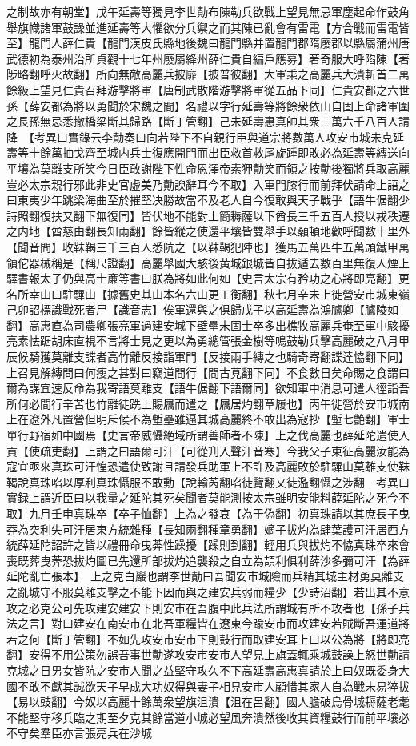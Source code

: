 之制故亦有朝堂】戊午延壽等獨見李世勣布陳勒兵欲戰上望見無忌軍塵起命作鼓角舉旗幟諸軍鼓譟並進延壽等大懼欲分兵禦之而其陳已亂會有雷電【方合戰而雷電皆至】龍門人薛仁貴【龍門漢皮氏縣地後魏曰龍門縣并置龍門郡隋廢郡以縣屬蒲州唐武德初為泰州治所貞觀十七年州廢屬絳州薛仁貴自編戶應募】著奇服大呼陷陳【著陟略翻呼火故翻】所向無敵高麗兵披靡【披普彼翻】大軍乘之高麗兵大潰斬首二萬餘級上望見仁貴召拜游擊將軍【唐制武散階游擊將軍從五品下同】仁貴安都之六世孫【薛安都為將以勇聞於宋魏之間】名禮以字行延壽等將餘衆依山自固上命諸軍圍之長孫無忌悉撤橋梁斷其歸路【斷丁管翻】己未延壽惠真帥其衆三萬六千八百人請降　【考異曰實錄云李勣奏曰向若陛下不自親行臣與道宗將數萬人攻安市城未克延壽等十餘萬抽戈齊至城内兵士復應開門而出臣救首救尾旋踵即敗必為延壽等縳送向平壤為莫離支所笑今日臣敢謝陛下性命恩澤帝素狎勣笑而領之按勣後獨將兵取高麗豈必太宗親行邪此非史官虚美乃勣諛辭耳今不取】入軍門膝行而前拜伏請命上語之曰東夷少年跳梁海曲至於摧堅决勝故當不及老人自今復敢與天子戰乎【語牛倨翻少詩照翻復扶又翻下無復同】皆伏地不能對上簡耨薩以下酋長三千五百人授以戎秩遷之内地【酋慈由翻長知兩翻】餘皆縱之使還平壤皆雙舉手以顙頓地歡呼聞數十里外【聞音問】收靺鞨三千三百人悉阬之【以靺鞨犯陣也】獲馬五萬匹牛五萬頭鐵甲萬領佗器械稱是【稱尺證翻】高麗舉國大駭後黄城銀城皆自拔遁去數百里無復人煙上驛書報太子仍與高士亷等書曰朕為將如此何如【史言太宗有矜功之心將即亮翻】更名所幸山曰駐驆山【據舊史其山本名六山更工衡翻】秋七月辛未上徙營安市城東嶺己卯詔標識戰死者尸【識音志】俟軍還與之俱歸戊子以高延壽為鴻臚卿【臚陵如翻】高惠直為司農卿張亮軍過建安城下壁壘未固士卒多出樵牧高麗兵奄至軍中駭擾亮素怯踞胡床直視不言將士見之更以為勇總管張金樹等鳴鼓勒兵擊高麗破之八月甲辰候騎獲莫離支諜者高竹離反接詣軍門【反接兩手縳之也騎奇寄翻諜逹恊翻下同】上召見解縳問曰何瘦之甚對曰竊道間行【間古莧翻下同】不食數日矣命賜之食謂曰爾為謀宜速反命為我寄語莫離支【語牛倨翻下語爾同】欲知軍中消息可遣人徑詣吾所何必間行辛苦也竹離徒跣上賜屩而遣之【屩居灼翻草履也】丙午徙營於安市城南上在遼外凡置營但明斥候不為塹壘雖逼其城高麗終不敢出為寇抄【塹七艶翻】軍士單行野宿如中國焉【史言帝威懾絶域所謂善師者不陳】上之伐高麗也薛延陀遣使入貢【使疏吏翻】上謂之曰語爾可汗【可從刋入聲汗音寒】今我父子東征高麗汝能為寇宜亟來真珠可汗惶恐遣使致謝且請發兵助軍上不許及高麗敗於駐驆山莫離支使靺鞨說真珠啗以厚利真珠懾服不敢動【說輸芮翻啗徒覽翻又徒濫翻懾之涉翻　考異曰實録上謂近臣曰以我量之延陀其死矣聞者莫能測按太宗雖明安能料薛延陀之死今不取】九月壬申真珠卒【卒子恤翻】上為之發哀【為于偽翻】初真珠請以其庶長子曳莽為突利失可汗居東方統雜種【長知兩翻種章勇翻】嫡子拔灼為肆葉護可汗居西方統薛延陀詔許之皆以禮冊命曳莾性躁擾【躁則到翻】輕用兵與拔灼不恊真珠卒來會喪既葬曳莾恐拔灼圖已先還所部拔灼追襲殺之自立為頡利俱利薛沙多彌可汗【為薛延陀亂亡張本】　上之克白巖也謂李世勣曰吾聞安市城險而兵精其城主材勇莫離支之亂城守不服莫離支擊之不能下因而與之建安兵弱而糧少【少詩沼翻】若出其不意攻之必克公可先攻建安建安下則安市在吾腹中此兵法所謂城有所不攻者也【孫子兵法之言】對曰建安在南安市在北吾軍糧皆在遼東今踰安市而攻建安若賊斷吾運道將若之何【斷丁管翻】不如先攻安市安市下則鼓行而取建安耳上曰以公為將【將即亮翻】安得不用公策勿誤吾事世勣遂攻安市安市人望見上旗蓋輒乘城鼓譟上怒世勣請克城之日男女皆阬之安市人聞之益堅守攻久不下高延壽高惠真請於上曰奴既委身大國不敢不獻其誠欲天子早成大功奴得與妻子相見安市人顧惜其家人自為戰未易猝拔【易以豉翻】今奴以高麗十餘萬衆望旗沮潰【沮在呂翻】國人膽破烏骨城耨薩老耄不能堅守移兵臨之期至夕克其餘當道小城必望風奔潰然後收其資糧鼓行而前平壤必不守矣羣臣亦言張亮兵在沙城